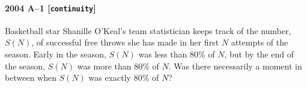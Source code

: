 \paragraph{2004 A--1 \textnormal{[\texttt{continuity}]}}
Basketball star Shanille O'Keal's team statistician
keeps track of the number, $S(N)$, of successful free throws she has made
in her first $N$ attempts of the season.
Early in the season, $S(N)$  was less than 80\% of $N$,
but by the end of the season, $S(N)$ was more than 80\% of $N$.
Was there necessarily a moment in between when $S(N)$ was exactly 80\% of $N$?
